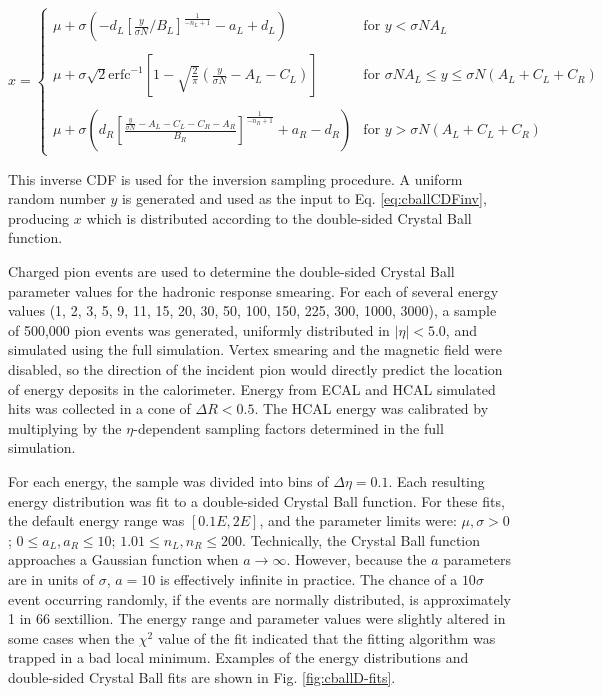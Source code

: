 \begin{equation}
x = \begin{cases}
\mu + \sigma \left(-d_{L}\left[\frac{y}{\sigma N}/B_{L}\right]^{\frac{1}{-n_{L}+1}}-a_{L}+d_{L} \right) & \text{for $y < \sigma N A_{L}$} \\
\\
\mu + \sigma \sqrt{2} \text{erfc}^{-1}\left[1-\sqrt{\frac{2}{\pi}}\left(\frac{y}{\sigma N}-A_{L}-C_{L}\right)\right] & \text{for $\sigma N A_{L} \leq y \leq \sigma N (A_{L} + C_{L} + C_{R})$} \\
\\
\mu + \sigma \left(d_{R}\left[\frac{\frac{y}{\sigma N} - A_{L} - C_{L} - C_{R} - A_{R}}{B_{R}}\right]^{\frac{1}{-n_{R}+1}}+a_{R}-d_{R}\right) & \text{for $y > \sigma N (A_{L} + C_{L} + C_{R})$}
\end{cases}
\label{eq:cballCDFinv}
\end{equation}

This inverse CDF is used for the inversion sampling procedure. A uniform random number $y$ is generated and used as the input to Eq. \eqref{eq:cballCDFinv}, producing $x$ which is distributed according to the double-sided Crystal Ball function.

Charged pion events are used to determine the double-sided Crystal Ball parameter values for the hadronic response smearing. For each of several energy values (1, 2, 3, 5, 9, 11, 15, 20, 30, 50, 100, 150, 225, 300, 1000, 3000\GeV), a sample of 500,000 pion events was generated, uniformly distributed in $|\eta|<5.0$, and simulated using the full simulation. Vertex smearing and the magnetic field were disabled, so the direction of the incident pion would directly predict the location of energy deposits in the calorimeter. Energy from ECAL and HCAL simulated hits was collected in a cone of $\Delta R < 0.5$. The HCAL energy was calibrated by multiplying by the $\eta$-dependent sampling factors determined in the full simulation.

For each energy, the sample was divided into bins of $\Delta \eta = 0.1$. Each resulting energy distribution was fit to a double-sided Crystal Ball function. For these fits, the default energy range was $[0.1E,2E]$, and the parameter limits were: $\mu, \sigma > 0$; $0 \leq a_{L}, a_{R} \leq 10$; $1.01 \leq n_{L}, n_{R} \leq 200$. Technically, the Crystal Ball function approaches a Gaussian function when $a \rightarrow \infty$. However, because the $a$ parameters are in units of $\sigma$, $a = 10$ is effectively infinite in practice. The chance of a $10\sigma$ event occurring randomly, if the events are normally distributed, is approximately 1 in 66 sextillion. The energy range and parameter values were slightly altered in some cases when the $\chi^{2}$ value of the fit indicated that the fitting algorithm was trapped in a bad local minimum. Examples of the energy distributions and double-sided Crystal Ball fits are shown in Fig. \ref{fig:cballD-fits}.

